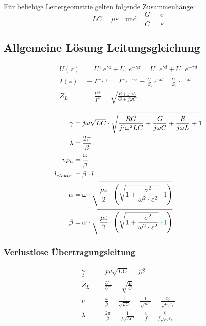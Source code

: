 \vspace{1ex}
Für beliebige Leitergeometrie gelten folgende Zusammenhänge:
\[
    LC = \mu\varepsilon \quad \text{und} \quad \frac{G}{C} = \frac{\sigma}{\varepsilon}
\]

\subsection{Allgemeine Lösung Leitungsgleichung}
\begin{align*}
    U(z) & = U^+ e^{\gamma z} + U^- e^{-\gamma z} = U^+ e^{\gamma d} + U^ - e^{-\gamma d}                      \\
    I(z) & = I^+ e^{\gamma z} + I^- e^{-\gamma z} = \frac{U^+}{Z_L}e^{\gamma d} - \frac{U^-}{Z_L}e^{-\gamma d} \\
    Z_L  & = \frac{U^+}{I^+} = \sqrt{ \frac{R + j \omega L}{G + j \omega C}}
\end{align*}

\begin{align*}
    \gamma      & = j \omega \sqrt{LC} \cdot \sqrt{ \frac{RG}{j^2 \omega^2 LC} + \frac{G}{j \omega C} + \frac{R}{j \omega L} + 1}                             \\
    \lambda     & = \frac{2 \pi}{\beta}                                                                                                                       \\
    v_{Ph}      & = \frac{\omega}{\beta}                                                                                                                      \\
    l_{elektr.} & = \beta \cdot l                                                                                                                             \\
    \alpha      & = \omega \cdot \sqrt{\dfrac{\mu \varepsilon}{2}\cdot \left(\sqrt{1+\dfrac{\sigma^2}{\omega^2\cdot\varepsilon^2}}{\color{red}{-}}1\right)}   \\
    \beta       & = \omega \cdot \sqrt{\dfrac{\mu \varepsilon}{2}\cdot \left(\sqrt{1+\dfrac{\sigma^2}{\omega^2\cdot\varepsilon^2}}{\color{green}{+}}1\right)}
\end{align*}

\subsubsection{Verlustlose Übertragungsleitung}
\begin{align*}
    \underline{\gamma} & = j\omega\sqrt{LC}= j\beta                                                                                           \\
    Z_L                & =\frac{U^+}{U^-}       = \sqrt{\frac{L}{C}}                                                                          \\
    v                  & = \frac{\omega}{\beta} = \frac{1}{\sqrt{LC}}= \frac{1}{\sqrt{\mu\varepsilon}}= \frac{c_0}{\sqrt{\mu_r\varepsilon_r}} \\
    \lambda            & = \frac{2\pi}{\beta}=\frac{1}{f\sqrt{LC}}= \frac{v}{f}= \frac{c_0}{f\sqrt{\mu_r\varepsilon_r}}
\end{align*}

